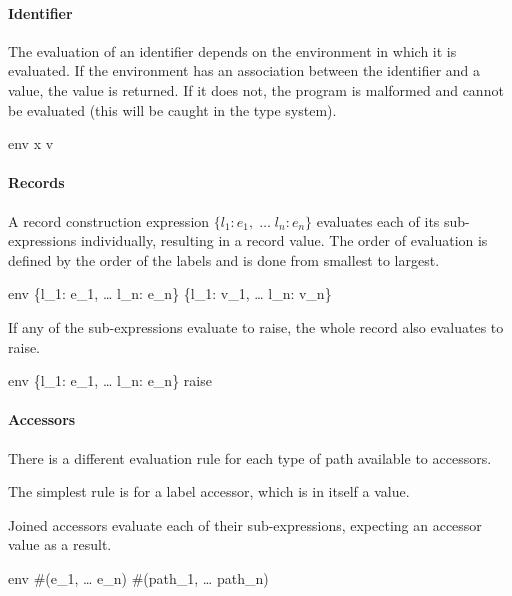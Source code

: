 \documentclass{article}
\begin{document}
\paragraph{Identifier}

The evaluation of an identifier depends on the environment in which it is evaluated.
If the environment has an association between the identifier and a value, the value is returned.
If it does not, the program is malformed and cannot be evaluated (this will be caught in the type system).

    {\mbox{env} \vdash x \Downarrow v}

\paragraph{Records}
A record construction expression $\{l_1: e_1, \; \dots \; l_n: e_n\}$ evaluates each of its sub-expressions individually, resulting in a record value.
The order of evaluation is defined by the order of the labels and is done from smallest to largest.

    {\mbox{env} \vdash \{l_1: e_1, \; \dots \; l_n: e_n\} \Downarrow \{l_1: v_1, \; \dots \; l_n: v_n\}}

If any of the sub-expressions evaluate to raise, the whole record also evaluates to raise.

    {\mbox{env} \vdash \{l_1: e_1, \; \dots \; l_n: e_n\} \Downarrow raise}

\paragraph{Accessors}

There is a different evaluation rule for each type of path available to accessors.

The simplest rule is for a label accessor, which is in itself a value.


Joined accessors evaluate each of their sub-expressions, expecting an accessor value as a result.

    {\mbox{env} \vdash \#(e_1, \; \dots \; e_n) \Downarrow \#(path_1, \; \dots \; path_n)}
\end{document}
